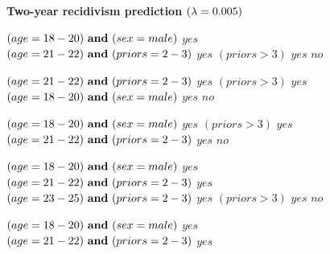 \begin{figure}[h!]
\textbf{Two-year recidivism prediction $({\lambda} = 0.005)$}
\vspace{1mm}
\begin{algorithmic}
\State \bif $(age = 18-20) {\bf ~and~} (sex = male)$ \bthen $yes$ 
\State \belif $(age = 21-22) {\bf ~and~} (priors = 2-3)$ \bthen $yes$
\State \belif $(priors > 3)$ \bthen $yes$
\State \belse $no$
\end{algorithmic}
\vspace{1mm}
\begin{algorithmic}
\State \bif $(age = 21-22) {\bf ~and~} (priors = 2-3)$ \bthen $yes$  
\State \belif $(priors > 3)$ \bthen $yes$
\State \belif $(age = 18-20) {\bf ~and~} (sex = male)$ \bthen $yes$
\State \belse $no$
\end{algorithmic}
\vspace{1mm}
\begin{algorithmic}
\State \bif $(age = 18-20) {\bf ~and~} (sex = male)$ \bthen $yes$ 
\State \belif $(priors > 3)$ \bthen $yes$
\State \belif $(age = 21-22) {\bf ~and~} (priors = 2-3)$ \bthen $yes$
\State \belse $no$
\end{algorithmic}
\vspace{1mm}
\begin{algorithmic}
\State \bif $(age = 18-20) {\bf ~and~} (sex = male)$ \bthen $yes$ 
\State \belif $(age = 21-22) {\bf ~and~} (priors = 2-3)$ \bthen $yes$
\State \belif $(age = 23-25) {\bf ~and~} (priors = 2-3)$ \bthen $yes$
\State \belif $(priors > 3)$ \bthen $yes$
\State \belse $no$
\end{algorithmic}
\vspace{1mm}
\begin{algorithmic}
\State \bif $(age = 18-20) {\bf ~and~} (sex = male)$ \bthen $yes$ 
\State \belif $(age = 21-22) {\bf ~and~} (priors = 2-3)$ \bthen $yes$

\end{algorithmic}
\end{figure}
